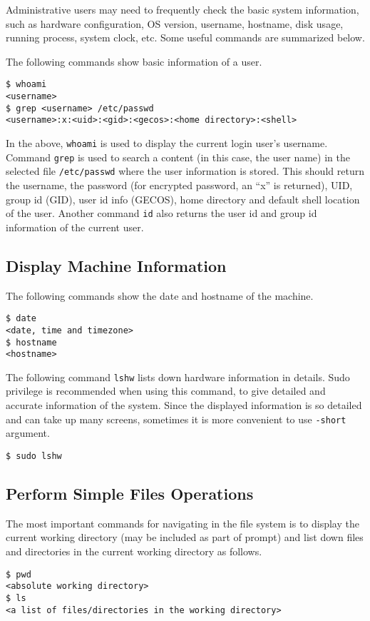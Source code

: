 Administrative users may need to frequently check the basic system information, such as hardware configuration, OS version, username, hostname, disk usage, running process, system clock, etc. Some useful commands are summarized below.

The following commands show basic information of a user.
\begin{verbatim}
$ whoami
<username>
$ grep <username> /etc/passwd
<username>:x:<uid>:<gid>:<gecos>:<home directory>:<shell>
\end{verbatim}
In the above, \verb|whoami| is used to display the current login user's username. Command \verb|grep| is used to search a content (in this case, the user name) in the selected file \verb|/etc/passwd| where the user information is stored. This should return the username, the password (for encrypted password, an ``x'' is returned), UID, group id (GID), user id info (GECOS), home directory and default shell location of the user.
Another command \verb|id| also returns the user id and group id information of the current user.

\subsection{Display Machine Information}

The following commands show the date and hostname of the machine.
\begin{verbatim}
$ date
<date, time and timezone>
$ hostname
<hostname>
\end{verbatim}

The following command \verb|lshw| lists down hardware information in details. Sudo privilege is recommended when using this command, to give detailed and accurate information of the system. Since the displayed information is so detailed and can take up many screens, sometimes it is more convenient to use \verb|-short| argument.
\begin{verbatim}
$ sudo lshw
\end{verbatim}

\subsection{Perform Simple Files Operations}

The most important commands for navigating in the file system is to display the current working directory (may be included as part of prompt) and list down files and directories in the current working directory as follows.
\begin{verbatim}
$ pwd
<absolute working directory>
$ ls
<a list of files/directories in the working directory>
\end{verbatim}

